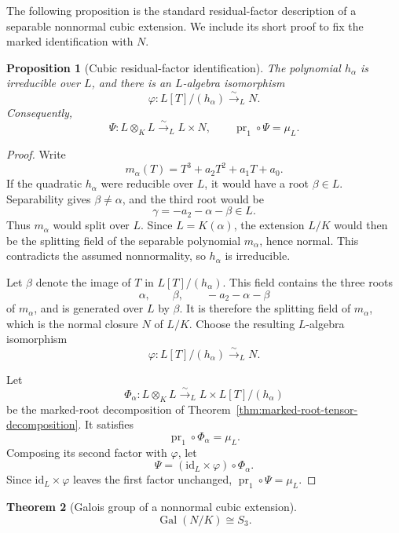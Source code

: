 \documentclass[11pt]{article}
\newtheorem{theorem}{Theorem}[section]
\newtheorem{proposition}[theorem]{Proposition}
\theoremstyle{remark}
\theoremstyle{definition}
\DeclareMathOperator{\Gal}{Gal}
\newcommand{\id}{\mathrm{id}}
\begin{document}
The following proposition is the standard residual-factor description
of a separable nonnormal cubic extension.  We include its short proof
to fix the marked identification with \(N\).

\begin{proposition}[Cubic residual-factor identification]
\label{prop:cubic-tensor-decomposition}
The polynomial \(h_\alpha\) is irreducible over \(L\), and there is an
\(L\)-algebra isomorphism
\[
  \varphi\colon L[T]/(h_\alpha)\xrightarrow{\sim}_L N.
\]
Consequently,
\[
  \Psi\colon L\otimes_KL\xrightarrow{\sim}_L L\times N,
  \qquad
  \operatorname{pr}_1\circ\Psi=\mu_L.
\]
\end{proposition}

\begin{proof}
Write
\[
  m_\alpha(T)=T^3+a_2T^2+a_1T+a_0.
\]
If the quadratic \(h_\alpha\) were reducible over \(L\), it would have a
root \(\beta\in L\).  Separability gives \(\beta\neq\alpha\), and the
third root would be
\[
  \gamma=-a_2-\alpha-\beta\in L.
\]
Thus \(m_\alpha\) would split over \(L\).  Since
\(L=K(\alpha)\), the extension \(L/K\) would then be the splitting
field of the separable polynomial \(m_\alpha\), hence normal.  This
contradicts the assumed nonnormality, so \(h_\alpha\) is irreducible.

Let \(\beta\) denote the image of \(T\) in \(L[T]/(h_\alpha)\).  This
field contains the three roots
\[
  \alpha,\qquad \beta,\qquad -a_2-\alpha-\beta
\]
of \(m_\alpha\), and is generated over \(L\) by \(\beta\).  It is
therefore the splitting field of \(m_\alpha\), which is the normal
closure \(N\) of \(L/K\).  Choose the resulting \(L\)-algebra
isomorphism
\[
  \varphi\colon L[T]/(h_\alpha)\xrightarrow{\sim}_L N.
\]

Let
\[
  \Phi_\alpha\colon
  L\otimes_KL
  \xrightarrow{\sim}_L
  L\times L[T]/(h_\alpha)
\]
be the marked-root decomposition of
Theorem~\ref{thm:marked-root-tensor-decomposition}.  It satisfies
\[
  \operatorname{pr}_1\circ\Phi_\alpha=\mu_L.
\]
Composing its second factor with \(\varphi\), let
\[
  \Psi=(\id_L\times\varphi)\circ\Phi_\alpha.
\]
Since \(\id_L\times\varphi\) leaves the first factor unchanged,
\(\operatorname{pr}_1\circ\Psi=\mu_L\).
\end{proof}

\begin{theorem}[Galois group of a nonnormal cubic extension]
\label{thm:index-three-core-free-s3}
\[
  \Gal(N/K)\cong S_3.
\]
\end{theorem}
\end{document}
